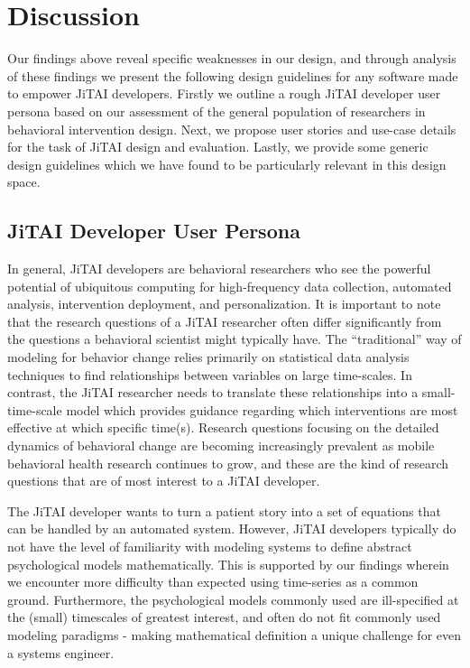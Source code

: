 \documentclass{sigchi}
\begin{document}
\section{Discussion}
Our findings above reveal specific weaknesses in our design, and through analysis of these findings we present the following design guidelines for any software made to empower JiTAI developers.
Firstly we outline a rough JiTAI developer user persona based on our assessment of the general population of researchers in behavioral intervention design.
Next, we propose user stories and use-case details for the task of JiTAI design and evaluation.
Lastly, we provide some generic design guidelines which we have found to be particularly relevant in this design space.

\subsection{JiTAI Developer User Persona}
In general, JiTAI developers are behavioral researchers who see the powerful potential of ubiquitous computing for high-frequency data collection, automated analysis, intervention deployment, and personalization.
It is important to note that the research questions of a JiTAI researcher often differ significantly from the questions a behavioral scientist might typically have.
The ``traditional'' way of modeling for behavior change relies primarily on statistical data analysis techniques to find relationships between variables on large time-scales.
In contrast, the JiTAI researcher needs to translate these relationships into a small-time-scale model which provides guidance regarding which interventions are most effective at which specific time(s).
Research questions focusing on the detailed dynamics of behavioral change are becoming increasingly prevalent as mobile behavioral health research continues to grow, and these are the kind of research questions that are of most interest to a JiTAI developer.

The JiTAI developer wants to turn a patient story into a set of equations that can be handled by an automated system.
However, JiTAI developers typically do not have the level of familiarity with modeling systems to define abstract psychological models mathematically.
This is supported by our findings wherein we encounter more difficulty than expected using time-series as a common ground. 
Furthermore, the psychological models commonly used are ill-specified at the (small) timescales of greatest interest, and often do not fit commonly used modeling paradigms - making mathematical definition a unique challenge for even a systems engineer.
\end{document}
